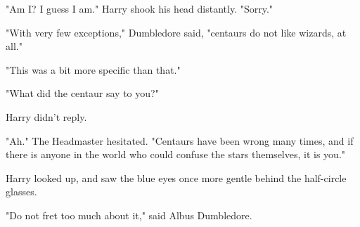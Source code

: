 "Am I? I guess I am." Harry shook his head distantly. "Sorry."

"With very few exceptions," Dumbledore said, "centaurs do not like wizards, at 
all."

"This was a bit more specific than that."

"What did the centaur say to you?"

Harry didn't reply.

"Ah." The Headmaster hesitated. "Centaurs have been wrong many times, and if 
there is anyone in the world who could confuse the stars themselves, it is you."

Harry looked up, and saw the blue eyes once more gentle behind the half-circle 
glasses.

"Do not fret too much about it," said Albus Dumbledore.
